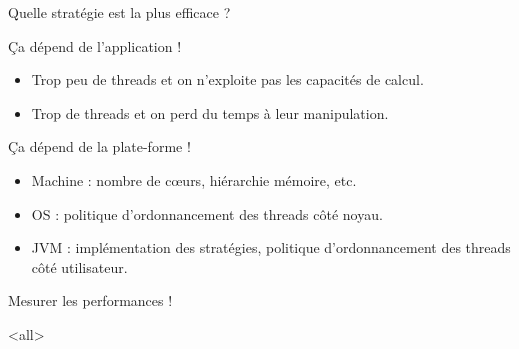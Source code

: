 \begin{frame}{Quelle stratégie est la plus efficace ?}
  \begin{block}{Ça dépend de l'application !} 
    \begin{itemize}
    \item Trop peu de threads et on n'exploite pas les capacités de calcul. 
    \item Trop de threads et on perd du temps à leur manipulation.
    \end{itemize}
  \end{block}
  
  \begin{block}{Ça dépend de la plate-forme !}
    \begin{itemize}
    \item Machine : nombre de c{\oe}urs, hiérarchie mémoire, etc.
    \item OS : politique d'ordonnancement des threads côté noyau.
    \item JVM : implémentation des stratégies, politique d'ordonnancement des threads côté utilisateur.
    \end{itemize}
  \end{block}
  
  \begin{center}
  \alert{Mesurer les performances !}
  \end{center}
\end{frame}





\mode<all>


